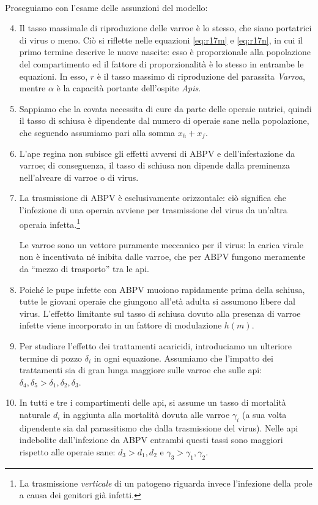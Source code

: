 \paragraph{}
Proseguiamo con l'esame delle assunzioni del modello:
\begin{enumerate}
    \setcounter{enumi}{3}
    \item Il tasso massimale di riproduzione delle varroe è lo stesso, che siano portatrici di virus o meno.
    Ciò si riflette nelle equazioni \eqref{eq:r17m} e \eqref{eq:r17n}, in cui il primo termine descrive le nuove nascite: esso è proporzionale alla popolazione del compartimento ed il fattore di proporzionalità è lo stesso in entrambe le equazioni. In esso, $r$ è il tasso massimo di riproduzione del parassita \emph{Varroa}, mentre $\alpha$ è la capacità portante dell'ospite \emph{Apis}.
    \item Sappiamo che la covata necessita di cure da parte delle operaie nutrici, quindi il tasso di schiusa è dipendente dal numero di operaie sane nella popolazione, che seguendo \cite{khoury2011} assumiamo pari alla somma $x_h + x_f$.
    \item L'ape regina non subisce gli effetti avversi di ABPV e dell'infestazione da varroe; di conseguenza, il tasso di schiusa non dipende dalla preminenza nell'alveare di varroe o di virus.
    \item La trasmissione di ABPV è esclusivamente orizzontale: ciò significa che l'infezione di una operaia avviene per trasmissione del virus da un'altra operaia infetta.\footnote{La trasmissione \emph{verticale} di un patogeno riguarda invece l'infezione della prole a causa dei genitori già infetti.}

    Le varroe sono un vettore puramente meccanico per il virus: la carica virale non è incentivata né inibita dalle varroe, che per ABPV fungono meramente da ``mezzo di trasporto'' tra le api.
    \item Poiché le pupe infette con ABPV muoiono rapidamente prima della schiusa, tutte le giovani operaie che giungono all'età adulta si assumono libere dal virus. L'effetto limitante sul tasso di schiusa dovuto alla presenza di varroe infette viene incorporato in un fattore di modulazione $h(m)$.
    \item Per studiare l'effetto dei trattamenti acaricidi, introduciamo un ulteriore termine di pozzo $\delta_i$ in ogni equazione. Assumiamo che l'impatto dei trattamenti sia di gran lunga maggiore sulle varroe che sulle api: $\delta_4, \delta_5 > \delta_1, \delta_2, \delta_3$.
    \item In tutti e tre i compartimenti delle api, si assume un tasso di mortalità naturale $d_i$ in aggiunta alla mortalità dovuta alle varroe $\gamma_i$ (a sua volta dipendente sia dal parassitismo che dalla trasmissione del virus). Nelle api indebolite dall'infezione da ABPV entrambi questi tassi sono maggiori rispetto alle operaie sane: $d_3 > d_1, d_2$ e $\gamma_3 > \gamma_1, \gamma_2$.


\end{enumerate}
